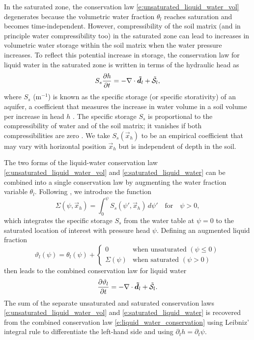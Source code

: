 \documentclass[twoside,10pt]{report}
\begin{document}
In the saturated zone, the conservation law \eqref{e:unsaturated_liquid_water_vol} degenerates because the volumetric water fraction $\theta_l$ reaches saturation and becomes time-independent. However, compressibility of the soil matrix (and in principle water compressibility too) in the saturated zone can lead to increases in volumetric water storage within the soil matrix when the water pressure increases. To reflect this potential increase in storage, the conservation law for liquid water in the saturated zone is written in terms of the hydraulic head as
\begin{equation}\label{e:saturated_liquid_water}
S_s \frac{\partial h}{\partial t} = - \nabla \cdot \boldsymbol{{\tilde d}}_l + \mathcal{\tilde S}_l,
\end{equation}
where $S_s$ ($\mathrm{m^{-1}}$) is known as the specific storage (or specific storativity) of an aquifer, a coefficient that measures the increase in water volume in a soil volume per increase in head $h$ \citep[][chapter~7]{Dingman15a}. The specific storage $S_s$ is proportional to the compressibility of water and of the soil matrix; it vanishes if both compressibilities are zero \citep[][chapter~5]{Bear18a}. We take $S_s(\vec{x}_h)$ to be an empirical coefficient that may vary with horizontal position $\vec{x}_h$ but is independent of depth in the soil.

The two forms of the liquid-water conservation law \eqref{e:unsaturated_liquid_water_vol} and \eqref{e:saturated_liquid_water} can be combined into a single conservation law by augmenting the water fraction variable $\theta_l$. Following \citet{Woodward00a}, we introduce the function
\begin{equation}
    \Sigma(\psi, \vec{x}_h) = \int_{0}^\psi S_s(\psi', \vec{x}_h)\,d\psi' \quad \text{for} \quad \psi > 0,
\end{equation}
which integrates the specific storage $S_s$ from the water table at $\psi=0$ to the saturated location of interest with pressure head $\psi$. 
Defining an augmented liquid fraction \citep{Woodward00a}
\begin{equation}\label{e:augmented_liquid_fraction}
    \vartheta_l(\psi) = \theta_l(\psi) + 
        \begin{cases}
        0 & \text{when unsaturated } (\psi \le 0)\\
        \Sigma(\psi) & \text{when saturated } (\psi > 0)
    \end{cases}
\end{equation}
then leads to the combined conservation law for liquid water 
\begin{equation}\label{e:liquid_water_conservation}
\frac{\partial \vartheta_l}{\partial t} = - \nabla \cdot \boldsymbol{{\tilde d}}_l + \mathcal{\tilde S}_l.
\end{equation}
The sum of the separate unsaturated and saturated conservation laws \eqref{e:unsaturated_liquid_water_vol} and \eqref{e:saturated_liquid_water} is recovered from the combined conservation law \eqref{e:liquid_water_conservation} using Leibniz' integral rule to differentiate the left-hand side and using $\partial_t h = \partial_t \psi$.
\end{document}
